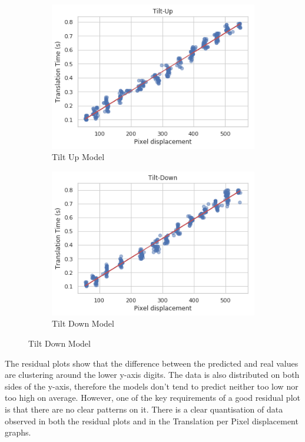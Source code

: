 \documentclass{l4proj}
\begin{document}
\begin{figure}[H]
\begin{subfigure}[b]{0.5\textwidth}
    \includegraphics[width=\textwidth]{l4template-master/images/tilt_up.png}
    \caption{Tilt Up Model}
    \label{tiltup}
  \end{subfigure}
  \begin{subfigure}[b]{0.5\textwidth}
    \includegraphics[width=\textwidth]{l4template-master/images/tilt_down.png}
    \caption{Tilt Down Model}
    \label{tiltdown}
  \end{subfigure}  
    
\end{figure}

The residual plots show that the difference between the predicted and real values are clustering around the lower y-axis digits. The data is also distributed on both sides of the y-axis, therefore the models don't tend to predict neither too low nor too high on average. However, one of the key requirements of a good residual plot is that there are no clear patterns on it. There is a clear quantisation of data observed in both the residual plots and in the Translation per Pixel displacement graphs. 
\end{document}
